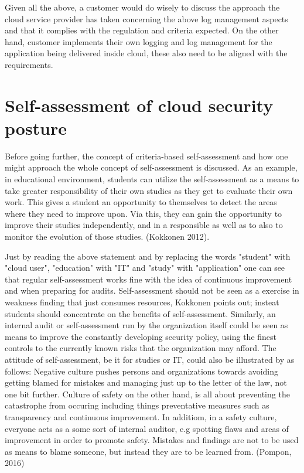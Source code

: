 \documentclass{article}
\begin{document}
\par
Given all the above, a customer would do wisely to discuss the approach the cloud service provider has taken concerning the above log management aspects and that it complies with the regulation and criteria expected. On the other hand, customer implements their own logging and log management for the application being delivered inside cloud, these also need to be aligned with the requirements.
\section{Self-assessment of cloud security posture}
Before going further, the concept of criteria-based self-assessment and how one might approach the whole concept of self-assessment is discussed. 
As an example, in educational environment, students can utilize the self-assessment as a means to take greater responsibility of their own studies as they get to evaluate their own work. This gives a student an opportunity to themselves to detect the areas where they need to improve upon.
Via this, they can gain the opportunity to improve their studies independently, and in a responsible as well as to also to monitor the evolution of those studies. (Kokkonen 2012).
\par
Just by reading the above statement and by replacing the words "student" with "cloud user", "education" with "IT" and "study" with "application" one can see that regular self-assessment works fine with the idea of continuous improvement and when preparing for audits.
Self-assessment should not be seen as a exercise in weakness finding that just consumes resources, Kokkonen points out; insteat students should concentrate on the benefits of self-assessment.
Similarly, an internal audit or self-assessment run by the organization itself could be seen as means to improve the constantly developing security policy, using the finest controls to the currently known risks that the organization may afford.
The attitude of self-assessment, be it for studies or IT, could also be illustrated by as follows: Negative culture pushes persons and organizations towards avoiding getting blamed for mistakes and managing just up to the letter of the law, not one bit further.
Culture of safety on the other hand, is all about preventing the catastrophe from occuring including things preventative measures such as transparency and continuous improvement. In additiom, in a safety culture, everyone acts as a some sort of internal auditor, e.g spotting flaws and areas of improvement in order to promote safety. Mistakes and findings are not to be used as means to blame someone, but instead they are to be learned from. (Pompon, 2016)
\end{document}
